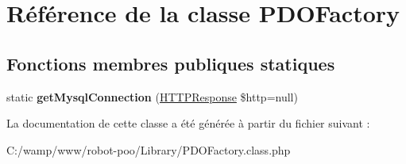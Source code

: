 \hypertarget{class_library_1_1_p_d_o_factory}{\section{Référence de la classe P\+D\+O\+Factory}
\label{class_library_1_1_p_d_o_factory}
}
\subsection*{Fonctions membres publiques statiques}
\begin{DoxyCompactItemize}
\item 
\hypertarget{class_library_1_1_p_d_o_factory_a6169adc833d91db09ffe685e81960778}{static {\bfseries get\+Mysql\+Connection} (\hyperlink{class_library_1_1_h_t_t_p_response}{H\+T\+T\+P\+Response} \$http=null)}\label{class_library_1_1_p_d_o_factory_a6169adc833d91db09ffe685e81960778}

\end{DoxyCompactItemize}


La documentation de cette classe a été générée à partir du fichier suivant \+:\begin{DoxyCompactItemize}
\item 
C\+:/wamp/www/robot-\/poo/\+Library/P\+D\+O\+Factory.\+class.\+php\end{DoxyCompactItemize}

